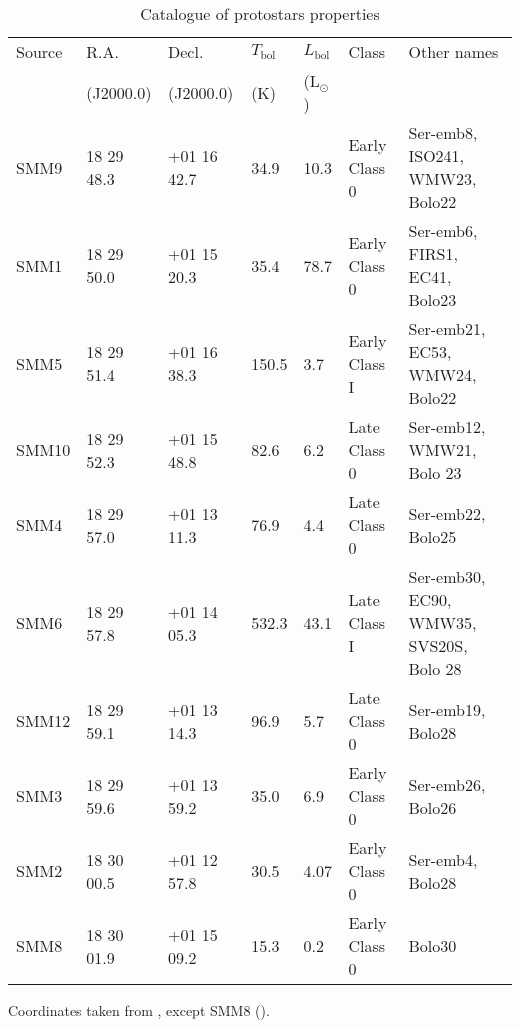 \documentclass{aa}
\begin{document}
\begin{table*}
\caption{Catalogue of protostars properties}             %
\label{table:2}      %
\centering                          %
\begin{tabular}{l l l l l l l} 
\hline\hline 
Source & R.A. & Decl. & $T_\mathrm{bol}$ &  $L_\mathrm{bol}$  & Class & Other names\\
 & (J2000.0) & (J2000.0) & (K) & (L$_\odot$) & &\\
\hline  

SMM9 & 18 29 48.3 & +01 16 42.7 &  34.9 & 10.3 & Early Class 0 &  Ser-emb8, ISO241, WMW23, Bolo22\\

SMM1 & 18 29 50.0 & +01 15 20.3 & 35.4 & 78.7 & Early Class 0 &  Ser-emb6, FIRS1, EC41, Bolo23\\

SMM5 & 18 29 51.4 & +01 16 38.3 & 150.5 & 3.7 & Early Class I & Ser-emb21, EC53, WMW24, Bolo22 \\

SMM10 & 18 29 52.3 & +01 15 48.8 & 82.6 & 6.2 & Late Class 0 & Ser-emb12, WMW21, Bolo 23\\

SMM4 & 18 29 57.0 & +01 13 11.3 & 76.9 & 4.4 & Late Class 0 &  Ser-emb22, Bolo25\\

SMM6 & 18 29 57.8 & +01 14 05.3 & 532.3 & 43.1 & Late Class I & Ser-emb30, EC90, WMW35, SVS20S, Bolo 28 \\

SMM12 & 18 29 59.1 & +01 13 14.3 & 96.9 & 5.7 & Late Class 0 &  Ser-emb19, Bolo28\\

SMM3 & 18 29 59.6 & +01 13 59.2 & 35.0 & 6.9 & Early Class 0 &  Ser-emb26, Bolo26\\

SMM2 & 18 30 00.5 & +01 12 57.8 & 30.5 & 4.07 & Early Class 0 & Ser-emb4, Bolo28\\

SMM8 & 18 30 01.9 & +01 15 09.2 & 15.3 & 0.2 & Early Class 0 & Bolo30\\
\hline
\end{tabular}
\begin{flushleft}
Coordinates taken from \citealt{Sur16}, except SMM8 (\citealt{Lee14}).\\
\end{flushleft}
\end{table*}
\end{document}
